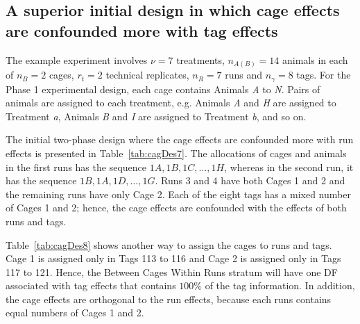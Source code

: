 \subsection{A superior initial design in which cage effects are confounded more with tag effects}
The example experiment involves $\nu = 7$ treatments, $n_{A(B)} = 14$ animals in each of $n_B = 2$ cages, $r_t = 2$ technical replicates, $n_R = 7$ runs and $n_\gamma = 8$ tags. For the Phase 1 experimental design, each cage contains Animals \textit{A} to \textit{N}. Pairs of animals are assigned to each treatment, e.g. Animals \textit{A} and \textit{H} are assigned to Treatment \textit{a}, Animals \textit{B} and \textit{I} are assigned to Treatment \textit{b}, and so on.

The initial two-phase design where the cage effects are confounded more with run effects is presented in Table~\ref{tab:cagDes7}. The allocations of cages and animals in the first runs has the sequence $1A, 1B, 1C, \dots, 1H$, whereas in the second run, it has the sequence $1B, 1A, 1D, \dots, 1G$. Runs 3 and 4 have both Cages 1 and 2 and the remaining runs have only Cage 2. Each of the eight tags has a mixed number of Cages 1 and 2; hence, the cage effects are confounded with the effects of both runs and tags. 

Table~\ref{tab:cagDes8} shows another way to assign the cages to runs and tags. Cage 1 is assigned only in Tags 113 to 116 and Cage 2 is assigned only in Tags 117 to 121. Hence, the Between Cages Within Runs stratum will have one DF associated with tag effects that contains $100\%$ of the tag information. In addition, the cage effects are orthogonal to the run effects, because each runs contains equal numbers of Cages 1 and 2. 


